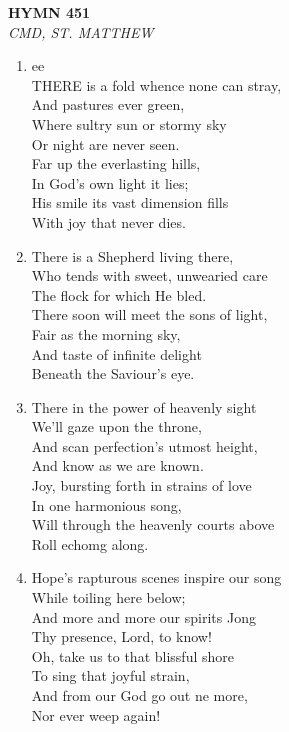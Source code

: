 \documentclass[11pt,a4paper]{article}
\begin{document}
\newpage
\begin{center}
    {\Large \textbf{HYMN 451}}
    \\
    \textit{CMD, ST. MATTHEW}
\end{center}
\vspace{1em}

\begin{enumerate}
    \item ee \\
        THERE is a fold whence none can stray, \\
        And pastures ever green, \\
        Where sultry sun or stormy sky \\
        Or night are never seen. \\
        Far up the everlasting hills, \\
        In God's own light it lies; \\
        His smile its vast dimension fills \\
        With joy that never dies.

    \item There is a Shepherd living there, \\
        Who tends with sweet, unwearied care \\
        The flock for which He bled. \\
        There soon will meet the sons of light, \\
        Fair as the morning sky, \\
        And taste of infinite delight \\
        Beneath the Saviour's eye.

    \item There in the power of heavenly sight \\
        We'll gaze upon the throne, \\
        And scan perfection's utmost height, \\
        And know as we are known. \\
        Joy, bursting forth in strains of love \\
        In one harmonious song, \\
        Will through the heavenly courts above \\
        Roll echomg along.

    \item Hope's rapturous scenes inspire our song \\
        While toiling here below; \\
        And more and more our spirits Jong \\
        Thy presence, Lord, to know! \\
        Oh, take us to that blissful shore \\
        To sing that joyful strain, \\
        And from our God go out ne more, \\
        Nor ever weep again!

\end{enumerate}
\end{document}
